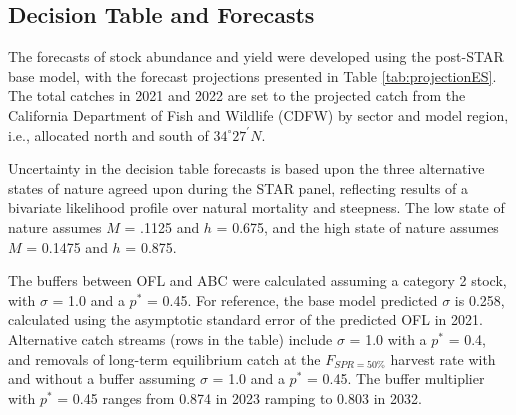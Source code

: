 \documentclass[11pt,
  english,
  a4paper,
]{article}
\begin{document}
\FloatBarrier


\hypertarget{decision-table-and-forecasts}{%
\subsection*{Decision Table and Forecasts}\label{decision-table-and-forecasts}}

\leavevmode\tagmcend\tagstructend

The forecasts of stock abundance and yield were developed using the post-STAR base model, with the forecast projections presented in Table \ref{tab:projectionES}. The total catches in 2021 and 2022 are set to the projected catch from the California Department of Fish and Wildlife (CDFW) by sector and model region, i.e., allocated north and south of $34^\circ 27^\prime N$.

Uncertainty in the decision table forecasts is based upon the three alternative states of nature agreed upon during the STAR panel, reflecting results of a bivariate likelihood profile over natural mortality and steepness. The low state of nature assumes {\(M\)\leavevmode\tagmcend\tagstructend} = .1125 and {\(h\)\leavevmode\tagmcend\tagstructend} = 0.675, and the high state of nature assumes {\(M\)\leavevmode\tagmcend\tagstructend} = 0.1475 and {\(h\)\leavevmode\tagmcend\tagstructend} = 0.875.

The buffers between OFL and ABC were calculated assuming a category 2 stock, with {\(\sigma\)\leavevmode\tagmcend\tagstructend} = 1.0 and a {\(p^*\)\leavevmode\tagmcend\tagstructend} = 0.45. For reference, the base model predicted {\(\sigma\)\leavevmode\tagmcend\tagstructend} is 0.258, calculated using the asymptotic standard error of the predicted OFL in 2021. Alternative catch streams (rows in the table) include {\(\sigma\)\leavevmode\tagmcend\tagstructend} = 1.0 with a {\(p^*\)\leavevmode\tagmcend\tagstructend} = 0.4, and removals of long-term equilibrium catch at the {\(F_{SPR=50\%}\)\leavevmode\tagmcend\tagstructend} harvest rate with and without a buffer assuming {\(\sigma\)\leavevmode\tagmcend\tagstructend} = 1.0 and a {\(p^*\)\leavevmode\tagmcend\tagstructend} = 0.45. The buffer multiplier with {\(p^*\)\leavevmode\tagmcend\tagstructend} = 0.45 ranges from 0.874 in 2023 ramping to 0.803 in 2032.
\end{document}
